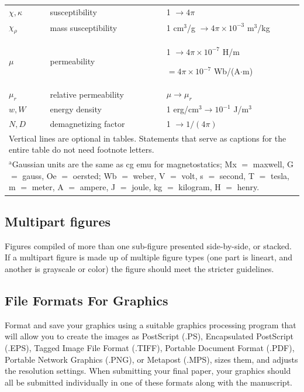 \documentclass{ieeeaccess}
\begin{document}
\begin{table}
\begin{tabular}{|p{25pt}|p{75pt}|p{115pt}|}
		$\chi , \kappa $            &
		susceptibility              &
		1 $\to  4\pi $                                                                                    \\
		$\chi_{\rho }$              &
		mass susceptibility         &
		1 cm$^{3}$/g $\to  4\pi \times  10^{-3}$ m$^{3}$/kg                                               \\
		$\mu $                      &
		permeability                &
		1 $\to  4\pi \times  10^{-7}$ H/m \par $= 4\pi \times  10^{-7}$ Wb/(A$\cdot $m)                   \\
		$\mu_{r}$                   &
		relative permeability       &
		$\mu \to \mu_{r}$                                                                                 \\
		$w, W$                      &
		energy density              &
		1 erg/cm$^{3} \to  10^{-1}$ J/m$^{3}$                                                             \\
		$N, D$                      &
		demagnetizing factor        &
		1 $\to  1/(4\pi )$                                                                                \\
		\hline
		\multicolumn{3}{p{251pt}}{Vertical lines are optional in tables. Statements that serve as captions for
		the entire table do not need footnote letters. }                                                  \\
		\multicolumn{3}{p{251pt}}{$^{\mathrm{a}}$Gaussian units are the same as cg emu for magnetostatics; Mx
			$=$ maxwell, G $=$ gauss, Oe $=$ oersted; Wb $=$ weber, V $=$ volt, s $=$
			second, T $=$ tesla, m $=$ meter, A $=$ ampere, J $=$ joule, kg $=$
			kilogram, H $=$ henry.}
	\end{tabular}
	\label{tab1}
\end{table}

\subsection{Multipart figures}
Figures compiled of more than one sub-figure presented side-by-side, or
stacked. If a multipart figure is made up of multiple figure types (one part is
lineart, and another is grayscale or color) the figure should meet the stricter
guidelines.

\subsection{File Formats For Graphics}\label{formats}
Format and save your graphics using a suitable graphics processing program that
will allow you to create the images as PostScript (.PS), Encapsulated
PostScript (.EPS), Tagged Image File Format (.TIFF), Portable Document Format
(.PDF), Portable Network Graphics (.PNG), or Metapost (.MPS), sizes them, and
adjusts the resolution settings. When submitting your final paper, your
graphics should all be submitted individually in one of these formats along
with the manuscript.
\end{document}
